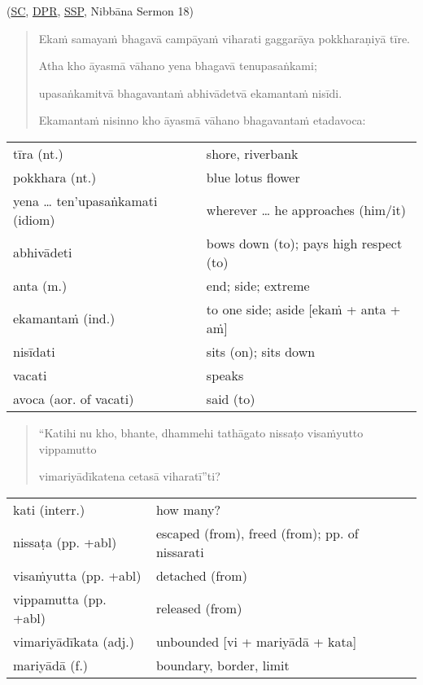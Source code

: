 \documentclass[11pt,oneside]{memoir}
\begin{document}
(\href{https://suttacentral.net/an10.81/pli/ms}{SC}, \href{https://www.digitalpalireader.online/\_dprhtml/index.html?loc=a.9.0.0.1.3.0.m}{DPR}, \href{http://localhost:4848/suttas/an10.81/pli/ms?window\_type=Sutta+Study}{SSP}, Nibbāna Sermon 18)

\begin{quote}
Ekaṁ samayaṁ bhagavā campāyaṁ viharati gaggarāya pokkharaṇiyā tīre.

Atha kho āyasmā vāhano yena bhagavā tenupasaṅkami;

upasaṅkamitvā bhagavantaṁ abhivādetvā ekamantaṁ nisīdi.

Ekamantaṁ nisinno kho āyasmā vāhano bhagavantaṁ etadavoca:
\end{quote}

\begin{longtable}{L{\colOne} L{\colTwo}}
tīra (nt.) & shore, riverbank\\[0pt]
pokkhara (nt.) & blue lotus flower\\[0pt]
yena \ldots{} ten'upasaṅkamati (idiom) & wherever \ldots{} he approaches (him/it)\\[0pt]
abhivādeti & bows down (to); pays high respect (to)\\[0pt]
anta (m.) & end; side; extreme\\[0pt]
ekamantaṁ (ind.) & to one side; aside [ekaṁ + anta + aṁ]\\[0pt]
nisīdati & sits (on); sits down\\[0pt]
vacati & speaks\\[0pt]
avoca (aor. of vacati) & said (to)\\[0pt]
\end{longtable}

\begin{quote}
“Katihi nu kho, bhante, dhammehi tathāgato nissaṭo visaṁyutto vippamutto

vimariyādīkatena cetasā viharatī”ti?
\end{quote}

\begin{longtable}{L{\colOne} L{\colTwo}}
kati (interr.) & how many?\\[0pt]
nissaṭa (pp. +abl) & escaped (from), freed (from); pp. of nissarati\\[0pt]
visaṁyutta (pp. +abl) & detached (from)\\[0pt]
vippamutta (pp. +abl) & released (from)\\[0pt]
vimariyādīkata (adj.) & unbounded [vi + mariyādā + kata]\\[0pt]
mariyādā (f.) & boundary, border, limit\\[0pt]
\end{longtable}
\end{document}
